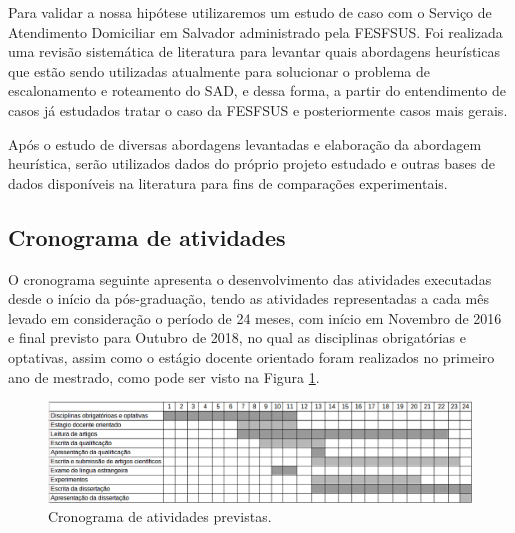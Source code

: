 Para validar a nossa hipótese utilizaremos um estudo de caso com o Serviço de Atendimento Domiciliar em Salvador administrado pela \ac{FESFSUS}. Foi realizada uma revisão sistemática de literatura para levantar quais abordagens heurísticas que estão sendo utilizadas atualmente para solucionar o problema de escalonamento e roteamento do \ac{SAD}, e dessa forma, a partir do entendimento de casos já estudados tratar o caso da \ac{FESFSUS} e posteriormente casos mais gerais.

Após o estudo de diversas abordagens levantadas e elaboração da abordagem heurística, serão utilizados dados do próprio projeto estudado e outras bases de dados disponíveis na literatura para fins de comparações experimentais.

\subsection{Cronograma de atividades}

O cronograma seguinte apresenta o desenvolvimento das atividades executadas desde o início da pós-graduação, tendo as atividades representadas a cada mês levado em consideração o período de 24 meses, com início em Novembro de 2016 e final previsto para Outubro de 2018, no qual as disciplinas obrigatórias e optativas, assim como o estágio docente orientado foram realizados no primeiro ano de mestrado, como pode ser visto na Figura \ref{cronograma_atividade}.

\begin{figure}[H]
\includegraphics[width=1 \textwidth]{cronograma_atividades.png}
\begin{center}
\caption{Cronograma de atividades previstas. \label{cronograma_atividade}}
\end{center}
\end{figure}

